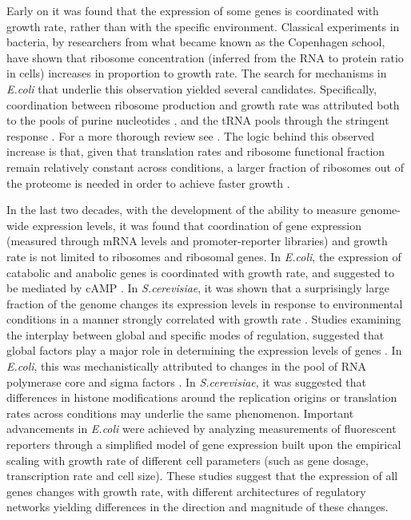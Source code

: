 \documentclass[notitlepage]{article}
\begin{document}
Early on it was found that the expression of some genes is coordinated with growth rate, rather than with the specific environment.
Classical experiments in bacteria, by researchers from what became known as the Copenhagen school, have shown that ribosome concentration (inferred from the RNA to protein ratio in cells) increases in proportion to growth rate\parencite{Schaechter1958}.
The search for mechanisms in \emph{E.coli} that underlie this observation yielded several candidates.
Specifically, coordination between ribosome production and growth rate was attributed both to the pools of purine nucleotides \parencite{Gourse1996,Gaal1997}, and the tRNA pools through the stringent response \parencite{Chatterji2001,Brauer2008a}.
For a more thorough review see \parencite{Nomura1984}.
The logic behind this observed increase is that, given that translation rates and ribosome functional fraction remain relatively constant across conditions, a larger fraction of ribosomes out of the proteome is needed in order to achieve faster growth \parencite{neidhardt1999a,dennis2004,Zaslaver2009}.

In the last two decades, with the development of the ability to measure genome-wide expression levels, it was found that coordination of gene expression (measured through mRNA levels and promoter-reporter libraries) and growth rate is not limited to ribosomes and ribosomal genes.
In \emph{E.coli}, the expression of catabolic and anabolic genes is coordinated with growth rate, and suggested to be mediated by cAMP \parencite{Saldanha2004}.
In \emph{S.cerevisiae}, it was shown that a surprisingly large fraction of the genome changes its expression levels in response to environmental conditions in a manner strongly correlated with growth rate \parencite{Keren2013a,Gasch2000,Castrillo2007,Zaslaver2009, Gerosa2013}.
Studies examining the interplay between global and specific modes of regulation, suggested that global factors play a major role in determining the expression levels of genes \parencite{Gasch2000, Klumpp2009a,Scott2010, Berthoumieux2013}.
In \emph{E.coli}, this was mechanistically attributed to changes in the pool of RNA polymerase core and sigma factors \parencite{Klumpp2008}.
In \emph{S.cerevisiae}, it was suggested that differences in histone modifications around the replication origins \parencite{regenberg2006} or translation rates \parencite{Gasch2000} across conditions may underlie the same phenomenon.
Important advancements in \emph{E.coli} were achieved by analyzing measurements of fluorescent reporters through a simplified model of gene expression built upon the empirical scaling with growth rate of different cell parameters (such as gene dosage, transcription rate and cell size)\parencite{Klumpp2009a}.
These studies suggest that the expression of all genes changes with growth rate, with different architectures of regulatory networks yielding differences in the direction and magnitude of these changes. 
\end{document}
